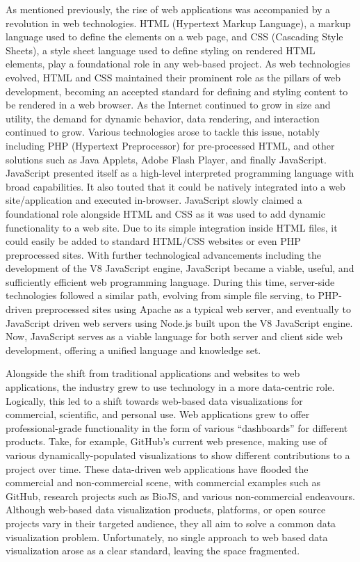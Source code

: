As mentioned previously, the rise of web applications was accompanied by a revolution in web technologies.  HTML (Hypertext Markup Language), a markup language used to define the elements on a web page, and CSS (Cascading Style Sheets), a style sheet language used to define styling on rendered HTML elements, play a foundational role in any web-based project.  As web technologies evolved, HTML and CSS maintained their prominent role as the pillars of web development, becoming an accepted standard for defining and styling content to be rendered in a web browser.  As the Internet continued to grow in size and utility, the demand for dynamic behavior, data rendering, and interaction continued to grow.  Various technologies arose to tackle this issue, notably including PHP (Hypertext Preprocessor) for pre-processed HTML, and other solutions such as Java Applets, Adobe Flash Player, and finally JavaScript.  JavaScript presented itself as a high-level interpreted programming language with broad capabilities.  It also touted that it could be natively integrated into a web site/application and executed in-browser.  JavaScript slowly claimed a foundational role alongside HTML and CSS as it was used to add dynamic functionality to a web site.  Due to its simple integration inside HTML files, it could easily be added to standard HTML/CSS websites or even PHP preprocessed sites.  With further technological advancements including the development of the V8 JavaScript engine, JavaScript became a viable, useful, and sufficiently efficient web programming language. During this time, server-side technologies followed a similar path, evolving from simple file serving, to PHP-driven preprocessed sites using Apache as a typical web server, and eventually to JavaScript driven web servers using Node.js built upon the V8 JavaScript engine.  Now, JavaScript serves as a viable language for both server and client side web development, offering a unified language and knowledge set. \par
Alongside the shift from traditional applications and websites to web applications, the industry grew to use technology in a more data-centric role.  Logically, this led to a shift towards web-based data visualizations for commercial, scientific, and personal use.  Web applications grew to offer professional-grade functionality in the form of various “dashboards” for different products.  Take, for example, GitHub’s current web presence, making use of various dynamically-populated visualizations to show different contributions to a project over time.  These data-driven web applications have flooded the commercial and non-commercial scene, with commercial examples such as GitHub, research projects such as BioJS, and various non-commercial endeavours.  Although web-based data visualization products, platforms, or open source projects vary in their targeted audience, they all aim to solve a common data visualization problem.  Unfortunately, no single approach to web based data visualization arose as a clear standard, leaving the space fragmented. \par

